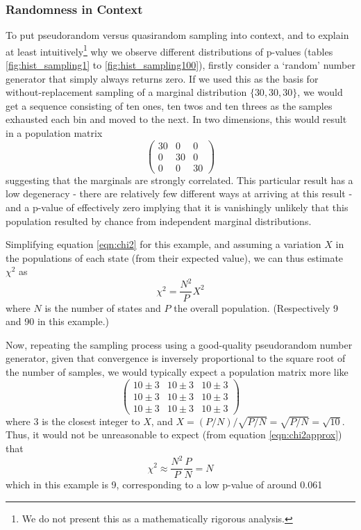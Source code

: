 \documentclass{JASSS}
\begin{document}
\subsubsection{Randomness in Context}\label{randomness-in-context}

To put pseudorandom versus quasirandom sampling into context, and to explain at least intuitively\footnote{We do not present this as a mathematically rigorous analysis.} 
why we observe different distributions of p-values (tables \ref{fig:hist_sampling1} to \ref{fig:hist_sampling100}), firstly consider a
`random' number generator that simply always returns zero. If we used
this as the basis for without-replacement sampling of a marginal
distribution \(\lbrace30,30,30\rbrace\), we would get a sequence
consisting of ten ones, ten twos and ten threes as the samples exhausted
each bin and moved to the next. In two dimensions, this would result in
a population matrix
\[\left( \begin{array}{ccc}
30 & 0 & 0 \\
0 & 30 & 0 \\
0 & 0 & 30 \end{array} \right)\]
suggesting that the marginals are strongly correlated. This particular
result has a low degeneracy - there are relatively few different ways at
arriving at this result - and a p-value of effectively zero implying
that it is vanishingly unlikely that this population resulted by chance from independent marginal distributions.

Simplifying equation \ref{eqn:chi2} for this example, and assuming a variation \(X\) in the 
populations of each state (from their expected value), we can thus estimate \(\chi^2\) as
\begin{equation}
\chi^2 = \frac{N^2}{P}X^2
\label{eqn:chi2approx}
\end{equation} 
where \(N\) is the number of states and \(P\) the overall population. (Respectively 9 and 90 in this example.)

Now, repeating the sampling process using a good-quality pseudorandom number generator, 
given that convergence is inversely proportional to the square root of the number of samples, 
we would typically expect a population matrix more like
\[\left( \begin{array}{ccc}
10\pm3 & 10\pm3 & 10\pm3 \\
10\pm3 & 10\pm3 & 10\pm3 \\
10\pm3 & 10\pm3 & 10\pm3 \end{array} \right)\]
where 3 is the closest integer to \(X\), and \(X=(P/N)/\sqrt{P/N}=\sqrt{P/N}=\sqrt{10}\). Thus, it would not be unreasonable to expect (from equation \ref{eqn:chi2approx}) that 
\begin{equation}
\chi^2 \approx \frac{N^2}{P}\frac{P}{N}=N
\end{equation}
which in this example is 9, corresponding to a low p-value of around 0.061
\end{document}
